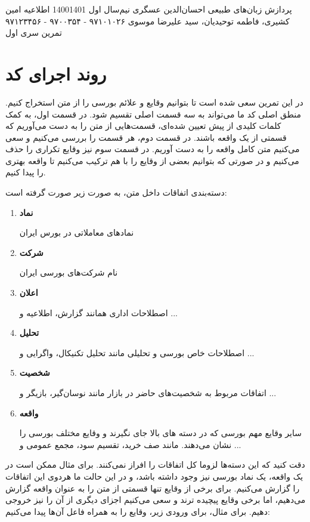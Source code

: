 \documentclass[a4paper,12pt]{article}
\begin{document}
\handout
{پردازش زبان‌های طبیعی}
{احسان‌الدین عسگری}
{نیم‌سال اول 1400\lr{-}1401}
{اطلاعیه}
{امین کشیری، فاطمه توحیدیان، سید علیرضا موسوی}
{۹۷۱۰۱۰۲۶ - ۹۷۰۰۳۵۴ - ۹۷۱۲۳۴۵۶}
{تمرین سری اول}


\section*{روند اجرای کد}

در این تمرین سعی شده است تا بتوانیم وقایع و علائم بورسی را از متن استخراج کنیم. 
منطق اصلی کد ما می‌تواند به سه قسمت اصلی تقسیم شود. در قسمت اول، به کمک کلمات کلیدی 
از پیش تعیین شده‌ای، قسمت‌هایی از متن را به دست می‌آوریم که قسمتی از یک واقعه باشند. در قسمت 
دوم، هر قسمت را بررسی می‌کنیم و سعی می‌کنیم متن کامل واقعه را به دست آوریم. در قسمت سوم نیز وقایع تکراری 
را حذف می‌کنیم و در صورتی که بتوانیم بعضی از وقایع‌ را با هم ترکیب می‌کنیم تا واقعه بهتری 
را پیدا کنیم.

دسته‌بندی اتفاقات داخل متن، به صورت زیر صورت گرفته است: 
\begin{enumerate}
    \item \textbf{نماد}
    
    نمادهای معاملاتی در بورس ایران
    \item \textbf{شرکت}
    
    نام شرکت‌های بورسی ایران 
    \item \textbf{اعلان}
    
    اصطلاحات اداری همانند گزارش، اطلاعیه و ...
	\item \textbf{تحلیل}
	
	اصطلاحات خاص بورسی و تحلیلی مانند تحلیل تکنیکال، واگرایی و ...
	\item \textbf{شخصیت}
	
	  اتفاقات مربوط به شخصیت‌های حاضر در بازار مانند نوسان‌گیر، بازیگر و
	  ...
	\item  \textbf{واقعه}
	
	سایر وقایع مهم بورسی که در دسته های بالا جای نگیرند و وقایع مختلف بورسی را نشان می‌دهند. مانند صف خرید، تقسیم سود، مجمع عمومی و ...
\end{enumerate}

دقت کنید که این دسته‌ها لزوما کل اتفاقات را افراز نمی‌کنند. برای مثال ممکن است در یک 
واقعه، یک نماد بورسی نیز وجود داشته باشد، و در این حالت ما هردوی این اتفاقات را گزارش می‌کنیم. برای برخی از وقایع 
تنها قسمتی از متن را به عنوان واقعه گزارش می‌دهیم، اما برخی وقایع پیچیده ترند و سعی می‌کنیم 
اجزای دیگری از آن را نیز خروجی دهیم. برای مثال، برای ورودی زیر، وقایع را به همراه 
فاعل آن‌ها پیدا می‌کنیم: 
\end{document}
